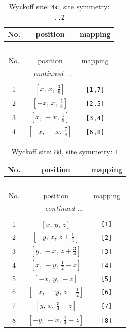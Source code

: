 \documentclass[fleqn,8pt]{jsarticle}
\begin{document}
\renewcommand{\arraystretch}{1.2}
\begin{longtable}{ccc}
\caption{Wyckoff site: {\tt 4c}, site symmetry: {\tt ..2}}
 \\
 \hline \hline
No. & position & mapping \\ \hline \endfirsthead

\multicolumn{2}{l}{\tablename\ \thetable{}} \\
 \hline \hline
No. & position & mapping \\ \hline \endhead

 \hline \hline
\multicolumn{2}{r}{\footnotesize\it continued ...} \\ \endfoot

 \hline \hline
\multicolumn{2}{r}{} \\ \endlastfoot

1 & $\left[ x,\, x,\, \frac{3}{8} \right]$ & {\tt [1,7]} \\ \hline
2 & $\left[ - x,\, x,\, \frac{5}{8} \right]$ & {\tt [2,5]} \\ \hline
3 & $\left[ x,\, - x,\, \frac{1}{8} \right]$ & {\tt [3,4]} \\ \hline
4 & $\left[ - x,\, - x,\, \frac{7}{8} \right]$ & {\tt [6,8]} \\
\end{longtable}
\renewcommand{\arraystretch}{1.2}
\begin{longtable}{ccc}
\caption{Wyckoff site: {\tt 8d}, site symmetry: {\tt 1}}
 \\
 \hline \hline
No. & position & mapping \\ \hline \endfirsthead

\multicolumn{2}{l}{\tablename\ \thetable{}} \\
 \hline \hline
No. & position & mapping \\ \hline \endhead

 \hline \hline
\multicolumn{2}{r}{\footnotesize\it continued ...} \\ \endfoot

 \hline \hline
\multicolumn{2}{r}{} \\ \endlastfoot

1 & $\left[ x,\, y,\, z \right]$ & {\tt [1]} \\ \hline
2 & $\left[ - y,\, x,\, z + \frac{1}{4} \right]$ & {\tt [2]} \\ \hline
3 & $\left[ y,\, - x,\, z + \frac{3}{4} \right]$ & {\tt [3]} \\ \hline
4 & $\left[ x,\, - y,\, \frac{1}{2} - z \right]$ & {\tt [4]} \\ \hline
5 & $\left[ - x,\, y,\, - z \right]$ & {\tt [5]} \\ \hline
6 & $\left[ - x,\, - y,\, z + \frac{1}{2} \right]$ & {\tt [6]} \\ \hline
7 & $\left[ y,\, x,\, \frac{3}{4} - z \right]$ & {\tt [7]} \\ \hline
8 & $\left[ - y,\, - x,\, \frac{1}{4} - z \right]$ & {\tt [8]} \\
\end{longtable}
\end{document}
